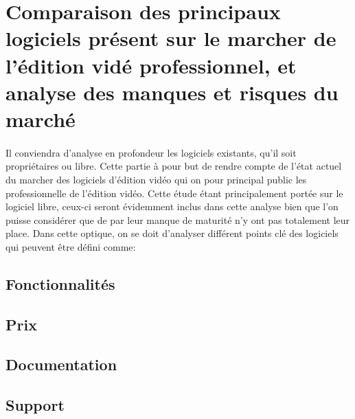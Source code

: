 \newpage
\section{Comparaison des principaux logiciels présent sur le marcher de
l'édition vidé professionnel, et analyse des manques et risques du marché}

\paragraph{}
  Il conviendra d'analyse en profondeur les logiciels existants, qu'il soit
  propriétaires ou libre. Cette partie à pour but de rendre compte de
  l'état actuel du marcher des logiciels d'édition vidéo qui on pour principal
  public les professionnelle de l'édition vidéo. Cette étude étant principalement portée
  sur le logiciel libre, ceux-ci seront évidemment inclus dans cette analyse
  bien que l'on puisse considérer que de par leur manque de maturité
  n'y ont pas totalement leur place. Dans cette optique, on se doit d'analyser
  différent points clé des logiciels qui peuvent être défini comme:

  \subsection{Fonctionnalités}
  \subsection{Prix}
  \subsection{Documentation}
  \subsection{Support}
